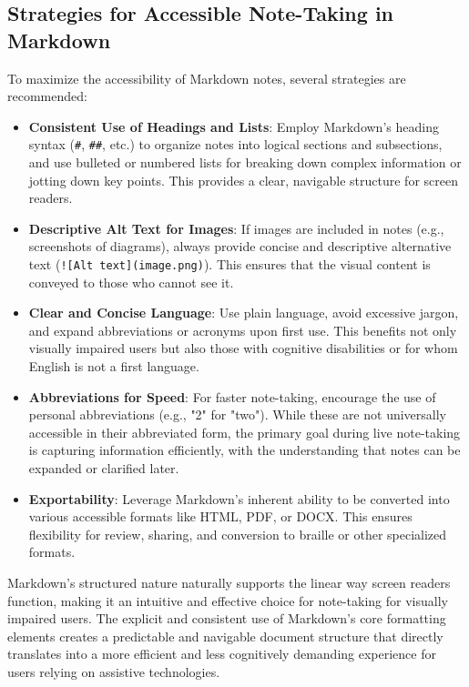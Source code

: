 \subsection{Strategies for Accessible Note-Taking in Markdown}
To maximize the accessibility of Markdown notes, several strategies are recommended:
\begin{itemize}
    \item \textbf{Consistent Use of Headings and Lists}: Employ Markdown's heading syntax (\texttt{\#}, \texttt{\#\#}, etc.) to organize notes into logical sections and subsections, and use bulleted or numbered lists for breaking down complex information or jotting down key points.\cite{MSPowerShellMarkdown}\cite{TeachingVI} This provides a clear, navigable structure for screen readers.
    \item \textbf{Descriptive Alt Text for Images}: If images are included in notes (e.g., screenshots of diagrams), always provide concise and descriptive alternative text (\texttt{![Alt text](image.png)}). This ensures that the visual content is conveyed to those who cannot see it.\cite{GitLabDocs}\cite{MarkdownToolbox}
    \item \textbf{Clear and Concise Language}: Use plain language, avoid excessive jargon, and expand abbreviations or acronyms upon first use. This benefits not only visually impaired users but also those with cognitive disabilities or for whom English is not a first language.\cite{MDNHTML}\cite{MSPowerShellMarkdown}
    \item \textbf{Abbreviations for Speed}: For faster note-taking, encourage the use of personal abbreviations (e.g., "2" for "two").\cite{PerkinsMonsterNote} While these are not universally accessible in their abbreviated form, the primary goal during live note-taking is capturing information efficiently, with the understanding that notes can be expanded or clarified later.
    \item \textbf{Exportability}: Leverage Markdown's inherent ability to be converted into various accessible formats like HTML, PDF, or DOCX.\cite{Inkdrop}\cite{Bear}\cite{CreateUW} This ensures flexibility for review, sharing, and conversion to braille or other specialized formats.
\end{itemize}
Markdown's structured nature naturally supports the linear way screen readers function, making it an intuitive and effective choice for note-taking for visually impaired users. The explicit and consistent use of Markdown's core formatting elements creates a predictable and navigable document structure that directly translates into a more efficient and less cognitively demanding experience for users relying on assistive technologies.

